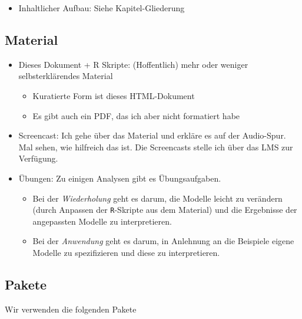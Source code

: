 \documentclass[
]{book}
\providecommand{\tightlist}{%
  \setlength{\itemsep}{0pt}\setlength{\parskip}{0pt}}
\begin{document}
\begin{itemize}
\tightlist
\item
  Inhaltlicher Aufbau: Siehe Kapitel-Gliederung
\end{itemize}

\hypertarget{material}{%
\subsection*{Material}\label{material}}

\begin{itemize}
\item
  Dieses Dokument + R Skripte: (Hoffentlich) mehr oder weniger selbsterklärendes Material

  \begin{itemize}
  \tightlist
  \item
    Kuratierte Form ist dieses HTML-Dokument
  \item
    Es gibt auch ein PDF, das ich aber nicht formatiert habe
  \end{itemize}
\item
  Screencast: Ich gehe über das Material und erkläre es auf der Audio-Spur. Mal sehen, wie hilfreich das ist. Die Screencasts stelle ich über das LMS zur Verfügung.
\item
  Übungen: Zu einigen Analysen gibt es Übungsaufgaben.

  \begin{itemize}
  \tightlist
  \item
    Bei der \emph{Wiederholung} geht es darum, die Modelle leicht zu verändern (durch Anpassen der \texttt{R}-Skripte aus dem Material) und die Ergebnisse der angepassten Modelle zu interpretieren.
  \item
    Bei der \emph{Anwendung} geht es darum, in Anlehnung an die Beispiele eigene Modelle zu spezifizieren und diese zu interpretieren.
  \end{itemize}
\end{itemize}

\hypertarget{pakete}{%
\subsection*{Pakete}\label{pakete}}

Wir verwenden die folgenden Pakete
\end{document}
